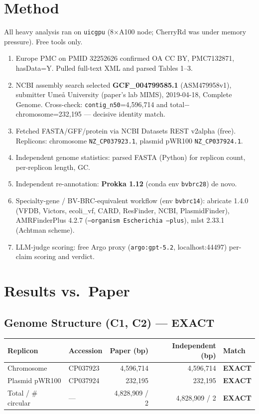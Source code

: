 \documentclass[11pt,letterpaper]{article}
\begin{document}
\section{Method}
All heavy analysis ran on \texttt{uicgpu} (8$\times$A100 node; CherryRd was under memory pressure). Free tools only.
\begin{enumerate}[nosep]
  \item Europe PMC on PMID 32252626 confirmed OA CC BY, PMC7132871, hasData=Y. Pulled full-text XML and parsed Tables 1--3.
  \item NCBI assembly search selected \textbf{GCF\_004799585.1} (ASM479958v1), submitter Ume\aa{} University (paper's lab MIMS), 2019-04-18, Complete Genome. Cross-check: \texttt{contig\_n50}=4{,}596{,}714 and total$-$chromosome=232{,}195 --- decisive identity match.
  \item Fetched FASTA/GFF/protein via NCBI Datasets REST v2alpha (free). Replicons: chromosome \texttt{NZ\_CP037923.1}, plasmid pWR100 \texttt{NZ\_CP037924.1}.
  \item Independent genome statistics: parsed FASTA (Python) for replicon count, per-replicon length, GC.
  \item Independent re-annotation: \textbf{Prokka 1.12} (conda env \texttt{bvbrc28}) de novo.
  \item Specialty-gene / BV-BRC-equivalent workflow (env \texttt{bvbrc14}): abricate 1.4.0 (VFDB, Victors, ecoli\_vf, CARD, ResFinder, NCBI, PlasmidFinder), AMRFinderPlus 4.2.7 (\texttt{--organism Escherichia --plus}), mlst 2.33.1 (Achtman scheme).
  \item LLM-judge scoring: free Argo proxy (\texttt{argo:gpt-5.2}, localhost:44497) per-claim scoring and verdict.
\end{enumerate}

\section{Results vs.\ Paper}

\subsection{Genome Structure (C1, C2) --- EXACT}
\begin{longtable}{llrrl}
\toprule
Replicon & Accession & Paper (bp) & Independent (bp) & Match \\
\midrule
Chromosome & CP037923 & 4{,}596{,}714 & 4{,}596{,}714 & \textbf{EXACT} \\
Plasmid pWR100 & CP037924 & 232{,}195 & 232{,}195 & \textbf{EXACT} \\
Total / \# circular & --- & 4{,}828{,}909 / 2 & 4{,}828{,}909 / 2 & \textbf{EXACT} \\
\bottomrule
\end{longtable}
\end{document}
